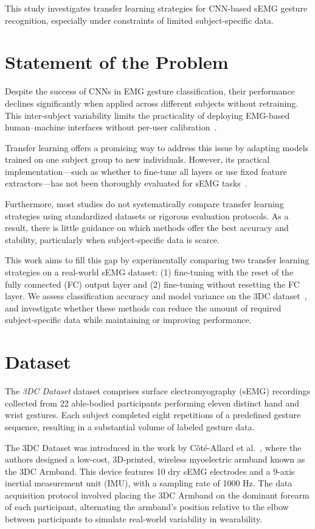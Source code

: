 This study investigates transfer learning strategies for CNN-based sEMG gesture recognition, especially under constraints of limited subject-specific data.

\section{Statement of the Problem}

Despite the success of CNNs in EMG gesture classification, their performance declines significantly when applied across different subjects without retraining. This inter-subject variability limits the practicality of deploying EMG-based human–machine interfaces without per-user calibration~\cite{Cote2019, Geng2016}.

Transfer learning offers a promising way to address this issue by adapting models trained on one subject group to new individuals. However, its practical implementation—such as whether to fine-tune all layers or use fixed feature extractors—has not been thoroughly evaluated for sEMG tasks~\cite{Lehmler2021}.

Furthermore, most studies do not systematically compare transfer learning strategies using standardized datasets or rigorous evaluation protocols. As a result, there is little guidance on which methods offer the best accuracy and stability, particularly when subject-specific data is scarce.

This work aims to fill this gap by experimentally comparing two transfer learning strategies on a real-world sEMG dataset: (1) fine-tuning with the reset of the fully connected (FC) output layer and (2) fine-tuning without resetting the FC layer. We assess classification accuracy and model variance on the 3DC dataset~\cite{Cote2019_3DC}, and investigate whether these methods can reduce the amount of required subject-specific data while maintaining or improving performance.

\section{Dataset}

The \textit{3DC Dataset} dataset comprises surface electromyography (sEMG) recordings collected from 22 able-bodied participants performing eleven distinct hand and wrist gestures. Each subject completed eight repetitions of a predefined gesture sequence, resulting in a substantial volume of labeled gesture data.

The 3DC Dataset was introduced in the work by Côté-Allard et al.~\cite{Cote2019_3DC}, where the authors designed a low-cost, 3D-printed, wireless myoelectric armband known as the 3DC Armband. This device features 10 dry sEMG electrodes and a 9-axis inertial measurement unit (IMU), with a sampling rate of 1000 Hz. The data acquisition protocol involved placing the 3DC Armband on the dominant forearm of each participant, alternating the armband's position relative to the elbow between participants to simulate real-world variability in wearability.


